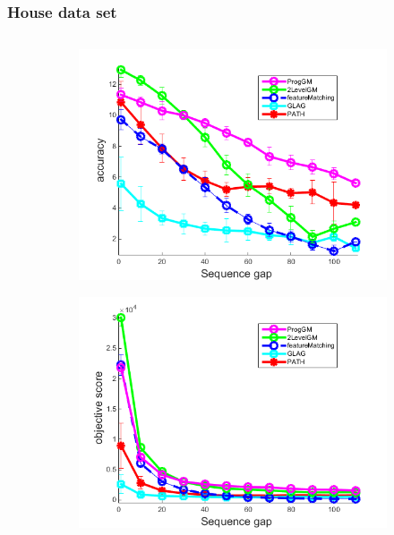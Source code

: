 \documentclass[hyperref={pdfpagelabels=false}]{beamer}
\begin{document}
\begin{frame}[allowframebreaks]
\frametitle{House data set}

\begin{minipage}[0.2\textheight]{\textwidth}
	\begin{columns}[T]
		\begin{column}{0.7\textwidth}

			\begin{figure}[h] \centering
					\begin{subfigure}[b]{0.32\textwidth}
						\centering
						\includegraphics[scale=0.12]{"fig/evaluation/HouseSeq2/anchor_descr/using_cpd_afftrafo/solution2/performance/accuracy"} 
					\end{subfigure} 
					\begin{subfigure}[b]{0.32\textwidth}
						\centering
						\includegraphics[scale=0.12]{"fig/evaluation/HouseSeq2/anchor_descr/using_cpd_afftrafo/solution2/performance/score"} 

\end{subfigure}
\end{figure}
\end{column}
\end{columns}
\end{minipage}
\end{frame}
\end{document}
